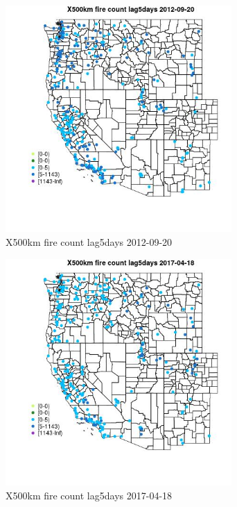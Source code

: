 \begin{figure} 
\centering  
\includegraphics[width=0.77\textwidth]{Code_Outputs/Report_ML_input_PM25_Step4_part_e_de_duplicated_aves_compiled_2019-05-14wNAs_MapObsX500km_fire_count_lag5days2012-09-20.jpg} 
\caption{\label{fig:Report_ML_input_PM25_Step4_part_e_de_duplicated_aves_compiled_2019-05-14wNAsMapObsX500km_fire_count_lag5days2012-09-20}X500km fire count lag5days 2012-09-20} 
\end{figure} 
 

\begin{figure} 
\centering  
\includegraphics[width=0.77\textwidth]{Code_Outputs/Report_ML_input_PM25_Step4_part_e_de_duplicated_aves_compiled_2019-05-14wNAs_MapObsX500km_fire_count_lag5days2017-04-18.jpg} 
\caption{\label{fig:Report_ML_input_PM25_Step4_part_e_de_duplicated_aves_compiled_2019-05-14wNAsMapObsX500km_fire_count_lag5days2017-04-18}X500km fire count lag5days 2017-04-18} 
\end{figure} 
 

